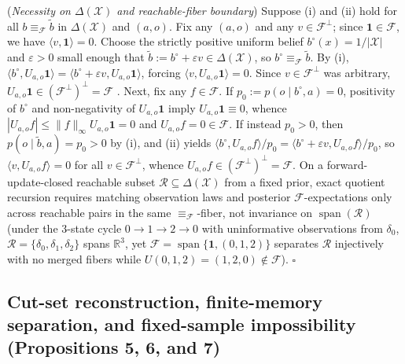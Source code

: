 \documentclass[11pt,letterpaper]{article}
\begin{document}
(\emph{Necessity on \(\Delta(\mathcal{X})\) and reachable-fiber
boundary}) Suppose (i) and (ii) hold for all
\(b \equiv_{\mathcal{F}} \tilde{b}\) in \(\Delta(\mathcal{X})\) and
\((a,o)\). Fix any \((a,o)\) and any \(v \in \mathcal{F}^\perp\); since
\(\mathbf{1} \in \mathcal{F}\), we have
\(\langle v, \mathbf{1}\rangle = 0\). Choose the strictly positive
uniform belief \(b^\circ(x) = 1/|\mathcal{X}|\) and \(\varepsilon > 0\)
small enough that
\(\tilde{b} := b^\circ + \varepsilon v \in \Delta(\mathcal{X})\), so
\(b^\circ \equiv_{\mathcal{F}} \tilde{b}\). By (i),
\(\langle b^\circ, U_{a,o}\mathbf{1}\rangle = \langle b^\circ + \varepsilon v, U_{a,o}\mathbf{1}\rangle\),
forcing \(\langle v, U_{a,o}\mathbf{1}\rangle = 0\). Since
\(v \in \mathcal{F}^\perp\) was arbitrary,
\(U_{a,o}\mathbf{1} \in (\mathcal{F}^\perp)^\perp = \mathcal{F}\)
\citep{poupartBoutilier2003}. Next, fix any \(f \in \mathcal{F}\). If
\(p_0 := p(o \mid b^\circ, a) = 0\), positivity of \(b^\circ\) and
non-negativity of \(U_{a,o}\mathbf{1}\) imply
\(U_{a,o}\mathbf{1} \equiv 0\), whence
\(|U_{a,o}f| \le \|f\|_\infty U_{a,o}\mathbf{1} = 0\) and
\(U_{a,o}f = 0 \in \mathcal{F}\). If instead \(p_0 > 0\), then
\(p(o \mid \tilde{b}, a) = p_0 > 0\) by (i), and (ii) yields
\(\langle b^\circ, U_{a,o}f\rangle / p_0 = \langle b^\circ + \varepsilon v, U_{a,o}f\rangle / p_0\),
so \(\langle v, U_{a,o}f\rangle = 0\) for all
\(v \in \mathcal{F}^\perp\), whence
\(U_{a,o}f \in (\mathcal{F}^\perp)^\perp = \mathcal{F}\). On a
forward-update-closed reachable subset
\(\mathcal{R} \subseteq \Delta(\mathcal{X})\) from a fixed prior, exact
quotient recursion requires matching observation laws and posterior
\(\mathcal{F}\)-expectations only across reachable pairs in the same
\(\equiv_{\mathcal{F}}\)-fiber, not invariance on
\(\operatorname{span}(\mathcal{R})\) (under the 3-state cycle
\(0 \to 1 \to 2 \to 0\) with uninformative observations from
\(\delta_0\), \(\mathcal{R}=\{\delta_0,\delta_1,\delta_2\}\) spans
\(\mathbb{R}^3\), yet
\(\mathcal{F}=\operatorname{span}\{\mathbf{1},(0,1,2)\}\) separates
\(\mathcal{R}\) injectively with no merged fibers while
\(U(0,1,2)=(1,2,0)\notin\mathcal{F}\)). \(\square\)

\subsection{Cut-set reconstruction, finite-memory separation, and
fixed-sample impossibility (Propositions 5, 6, and
7)}\label{cut-set-reconstruction-finite-memory-separation-and-fixed-sample-impossibility-propositions-5-6-and-7}
\end{document}
